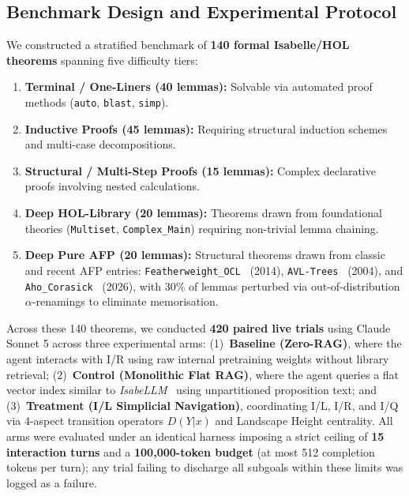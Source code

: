 \documentclass{svproc}
\begin{document}
\subsection{Benchmark Design and Experimental Protocol}\label{sec:benchmark_setup}

We constructed a stratified benchmark of \textbf{140 formal Isabelle/HOL theorems} spanning five difficulty tiers:
\begin{enumerate}
    \item \textbf{Terminal / One-Liners (40 lemmas):} Solvable via automated proof methods (\texttt{auto}, \texttt{blast}, \texttt{simp}).
    \item \textbf{Inductive Proofs (45 lemmas):} Requiring structural induction schemes and multi-case decompositions.
    \item \textbf{Structural / Multi-Step Proofs (15 lemmas):} Complex declarative proofs involving nested calculations.
    \item \textbf{Deep HOL-Library (20 lemmas):} Theorems drawn from foundational theories (\texttt{Multiset}, \texttt{Complex\_Main}) requiring non-trivial lemma chaining.
    \item \textbf{Deep Pure AFP (20 lemmas):} Structural theorems drawn from classic and recent AFP entries: \texttt{Featherweight\_\allowbreak OCL}~\cite{Brucker-AFP-Featherweight_OCL} (2014), \texttt{AVL-Trees}~\cite{Nipkow-AFP-AVL_Trees} (2004), and \texttt{Aho\_Corasick}~\cite{Ramos-AFP-Aho_Corasick} (2026), with 30\% of lemmas perturbed via out-of-distribution $\alpha$-renamings to eliminate memorisation.
\end{enumerate}
Across these 140 theorems, we conducted \textbf{420 paired live trials} using Claude Sonnet 5 across three experimental arms: (1)~\textbf{Baseline (Zero-RAG)}, where the agent interacts with I/R using raw internal pretraining weights without library retrieval; (2)~\textbf{Control (Monolithic Flat RAG)}, where the agent queries a flat vector index similar to \emph{IsabeLLM}~\cite{jones_isabellm_2026} using unpartitioned proposition text; and (3)~\textbf{Treatment (I/L Simplicial Navigation)}, coordinating I/L, I/R, and I/Q via 4-aspect transition operators $D(Y | x)$ and Landscape Height centrality. All arms were evaluated under an identical harness imposing a strict ceiling of \textbf{15 interaction turns} and a \textbf{100,000-token budget} (at most 512 completion tokens per turn); any trial failing to discharge all subgoals within these limits was logged as a failure.
\end{document}
